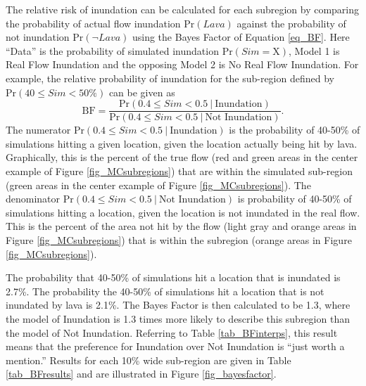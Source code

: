 		The relative risk of inundation can be calculated for each subregion by comparing the probability of actual flow inundation $\text{Pr}(Lava)$ against the probability of not inundation $\text{Pr}(\neg Lava)$ using the Bayes Factor of Equation \ref{eq_BF}. Here ``Data'' is the probability of simulated inundation $\text{Pr}(Sim=\text{X})$, Model 1 is Real Flow Inundation and the opposing Model 2 is No Real Flow Inundation. For example, the relative probability of inundation for the sub-region defined by $\text{Pr}(40\le Sim<50\%)$ can be given as
		\begin{equation}
			\text{BF} = \frac{\text{Pr}(0.4\le Sim<0.5~|~\text{Inundation})}{\text{Pr}(0.4\le Sim<0.5~|~\text{Not~Inundation})}.
		\end{equation}
		The numerator $\text{Pr}(0.4\le Sim<0.5~|~\text{Inundation})$ is the probability of 40-50\% of simulations hitting a given location, given the location actually being hit by lava. Graphically, this is the percent of the true flow (red and green areas in the center example of Figure \ref{fig_MCsubregions}) that are within the simulated sub-region (green areas in the center example of Figure \ref{fig_MCsubregions}). The denominator $\text{Pr}(0.4\le Sim<0.5~|~\text{Not Inundation})$ is probability of 40-50\% of simulations hitting a location, given the location is not inundated in the real flow. This is the percent of the area not hit by the flow (light gray and orange areas in Figure \ref{fig_MCsubregions}) that is within the subregion (orange areas in Figure \ref{fig_MCsubregions}). 
		
		The probability that 40-50\% of simulations hit a location that is inundated is 2.7\%. The probability the 40-50\% of simulations hit a location that is not inundated by lava is 2.1\%. The Bayes Factor is then calculated to be 1.3, where the model of Inundation is 1.3 times more likely to describe this subregion than the model of Not Inundation. Referring to Table \ref{tab_BFinterps}, this result means that the preference for Inundation over Not Inundation is ``just worth a mention.'' Results for each 10\% wide sub-region are given in Table \ref{tab_BFresults} and are illustrated in Figure \ref{fig_bayesfactor}.
		

